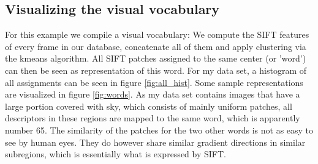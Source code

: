 \documentclass{paper}
\begin{document}
\subsection{Visualizing the visual vocabulary}
For this example we compile a visual vocabulary: We compute the SIFT features of every 
frame in our database, concatenate all of them and apply clustering via the kmeans 
algorithm. All SIFT patches assigned to the same center (or 'word') can then be 
seen as representation of this word. For my data set, a histogram of all assignments can be
seen in figure \ref{fig:all_hist}. Some sample representations are visualized in figure 
\ref{fig:words}. As my data set contains images that have a large portion covered with sky,
which consists of mainly uniform patches, all descriptors in these regions are mapped to
the same word, which is apparently number 65. The similarity of the patches for the two 
other words is not as easy to see by human eyes. They do however share similar gradient
directions in similar subregions, which is essentially what is expressed by SIFT. 
\end{document}

